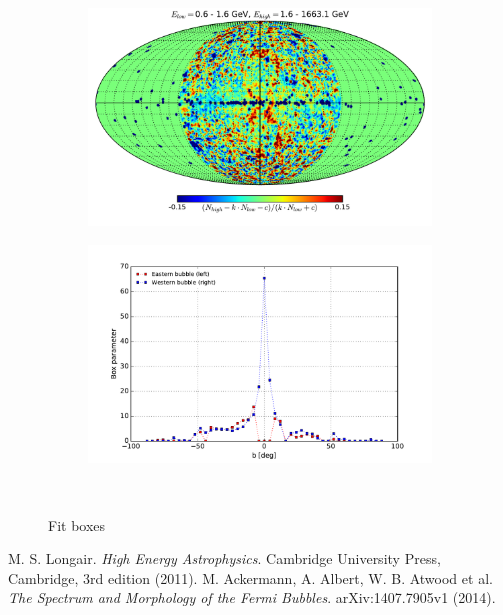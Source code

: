 \documentclass[a4paper]{article}
\begin{document}
\begin{figure}[h]
{\begin{subfigure}[b]{.5\textwidth}
		\includegraphics[width=.95\textwidth]{FitE_mollweide_at_0-1_to_1-1663_norm_fitbubshape.pdf}
	\end{subfigure}%
	\begin{subfigure}[b]{.5\textwidth}
		\centering
		\includegraphics[width=.95\textwidth]{FitE_boxprof_at_0-1_to_1-1663_norm_fitbubshape.pdf}
	\end{subfigure}%
	}\\
\caption{Fit boxes}
\label{Fit_IC_pi0_to_ROI}
\end{figure}


\newpage
\begin{thebibliography}{9}
	 M. S. Longair. \textit{High Energy Astrophysics}. Cambridge University Press, Cambridge, 3rd edition (2011).
	 M. Ackermann, A. Albert, W. B. Atwood et al. \textit{The Spectrum and Morphology of the \textit{Fermi} Bubbles}. arXiv:1407.7905v1 (2014).\\
\end{thebibliography}
\end{document}
